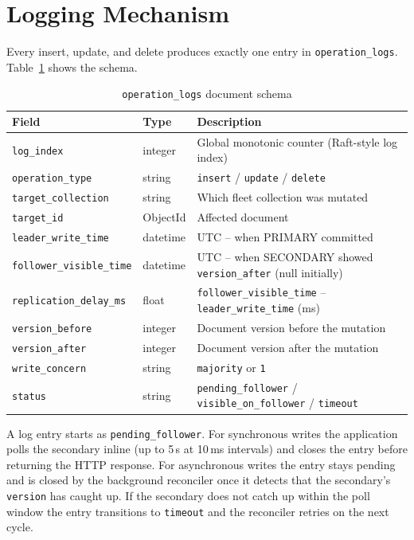 \documentclass[12pt,a4paper]{article}
\newcommand{\code}[1]{\texttt{\small #1}}
\begin{document}
\section{Logging Mechanism}

Every insert, update, and delete produces exactly one entry in \code{operation\_logs}.
Table~\ref{tab:oplog} shows the schema.

\begin{table}[H]
  \centering
  \caption{\texttt{operation\_logs} document schema}
  \label{tab:oplog}
  \small
  \begin{tabularx}{\textwidth}{llX}
    \toprule
    Field & Type & Description \\
    \midrule
    \code{log\_index}              & integer  & Global monotonic counter (Raft-style log index) \\
    \code{operation\_type}         & string   & \texttt{insert} / \texttt{update} / \texttt{delete} \\
    \code{target\_collection}      & string   & Which fleet collection was mutated \\
    \code{target\_id}              & ObjectId & Affected document \\
    \code{leader\_write\_time}     & datetime & UTC -- when PRIMARY committed \\
    \code{follower\_visible\_time} & datetime & UTC -- when SECONDARY showed \texttt{version\_after} (null initially) \\
    \code{replication\_delay\_ms}  & float    & \texttt{follower\_visible\_time} -- \texttt{leader\_write\_time} (ms) \\
    \code{version\_before}         & integer  & Document version before the mutation \\
    \code{version\_after}          & integer  & Document version after the mutation \\
    \code{write\_concern}          & string   & \texttt{majority} or \texttt{1} \\
    \code{status}                  & string   & \texttt{pending\_follower} / \texttt{visible\_on\_follower} / \texttt{timeout} \\
    \bottomrule
  \end{tabularx}
\end{table}

A log entry starts as \code{pending\_follower}. For synchronous writes the application
polls the secondary inline (up to 5\,s at 10\,ms intervals) and closes the entry before
returning the HTTP response. For asynchronous writes the entry stays pending and is
closed by the background reconciler once it detects that the secondary's \code{version}
has caught up. If the secondary does not catch up within the poll window
the entry transitions to \code{timeout} and the reconciler retries on the next cycle.
\end{document}

